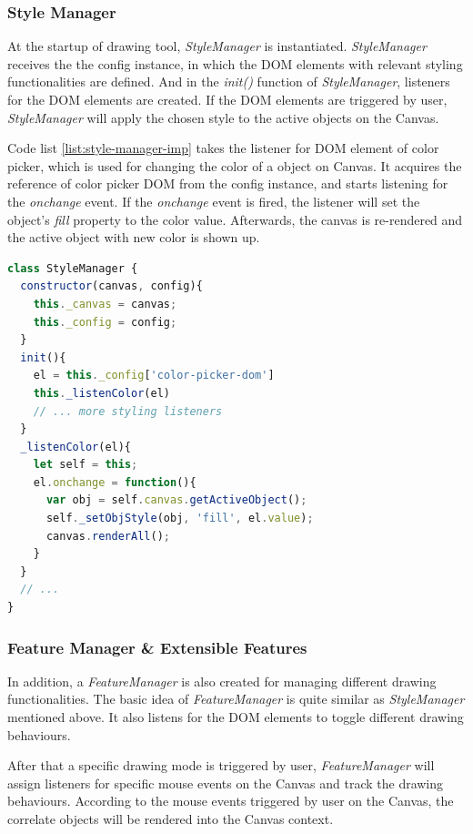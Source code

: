 \subsubsection{Style Manager}
At the startup of drawing tool, \textit{StyleManager} is instantiated. \textit{StyleManager} receives the the config instance, in which the DOM elements with relevant styling functionalities are defined. And in the \textit{init()} function of \textit{StyleManager}, listeners for the DOM elements are created. If the DOM elements are triggered by user, \textit{StyleManager} will apply the chosen style to the active objects on the Canvas.

Code list \ref{list:style-manager-imp} takes the listener for DOM element of color picker, which is used for changing the color of a object on Canvas. It acquires the reference of color picker DOM from the config instance, and starts listening for the \textit{onchange} event. If the \textit{onchange} event is fired, the listener will set the object's \textit{fill} property to the color value. Afterwards, the canvas is re-rendered and the active object with new color is shown up.

\begin{lstlisting}[language=JavaScript, caption=Main process of StyleManager, label={list:style-manager-imp}]
class StyleManager {
  constructor(canvas, config){
    this._canvas = canvas;
    this._config = config;
  }
  init(){
    el = this._config['color-picker-dom']
    this._listenColor(el)
    // ... more styling listeners
  }
  _listenColor(el){
    let self = this;
    el.onchange = function(){
      var obj = self.canvas.getActiveObject();
      self._setObjStyle(obj, 'fill', el.value);
      canvas.renderAll();
    }
  }
  // ...
}
\end{lstlisting}


\subsubsection{Feature Manager \& Extensible Features}

In addition, a \textit{FeatureManager} is also created for managing different drawing functionalities. The basic idea of \textit{FeatureManager} is quite similar as \textit{StyleManager} mentioned above. It also listens for the DOM elements to toggle different drawing behaviours.

After that a specific drawing mode is triggered by user, \textit{FeatureManager} will assign listeners for specific mouse events on the Canvas and track the drawing behaviours. According to the mouse events triggered by user on the Canvas, the correlate objects will be rendered into the Canvas context.

